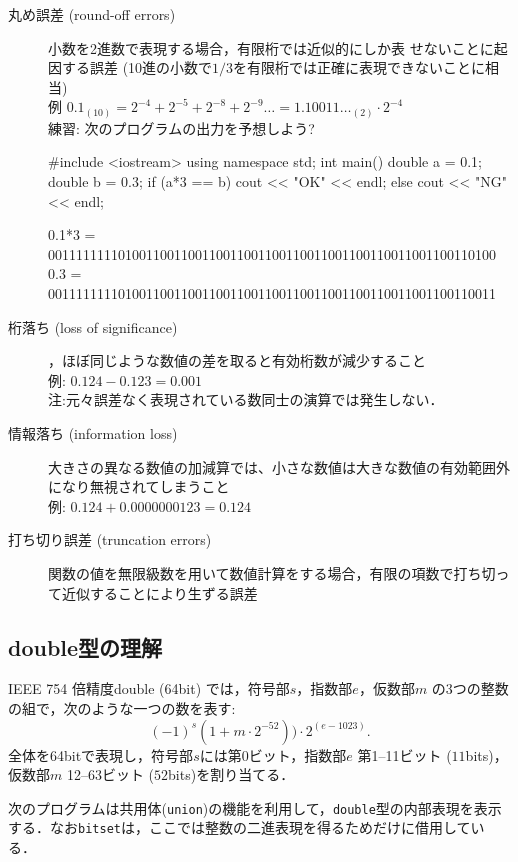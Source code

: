 \begin{description}
\item[丸め誤差 (round-off errors)] 小数を2進数で表現する場合，有限桁では近似的にしか表
  せないことに起因する誤差 (10進の小数で$1/3$を有限桁では正確に表現できないことに相当)\\
  例 $0.1_{(10)} = 2^{-4} + 2^{-5}+2^{-8}+2^{-9}\ldots =
  1.10011\ldots_{(2)}\cdot 2^{-4}$\\
  練習: 次のプログラムの出力を予想しよう?
  \begin{cbox}
#include <iostream>
using namespace std;
int main() {
  double a = 0.1;
  double b = 0.3;
  if (a*3 == b) cout << "OK" << endl;
  else cout << "NG" << endl;
}    
  \end{cbox}
  \begin{terminal}
0.1*3 = 0011111111010011001100110011001100110011001100110011001100110100
  0.3 = 0011111111010011001100110011001100110011001100110011001100110011    
  \end{terminal}
\item[桁落ち (loss of significance)] ，ほぼ同じような数値の差を取ると有効桁数が減少すること\\
  例: $0.124 - 0.123 = 0.001$\\
注:元々誤差なく表現されている数同士の演算では発生しない．
\item[情報落ち (information loss)] 大きさの異なる数値の加減算では、小さな数値は大きな数値の有効範囲外になり無視されてしまうこと\\
  例: $0.124 + 0.0000000123 = 0.124$
\item[打ち切り誤差 (truncation errors)] 関数の値を無限級数を用いて数値計算をする場合，有限の項数で打ち切って近似することにより生ずる誤差
\end{description}

\subsection{double型の理解}
IEEE 754 倍精度double (64bit) では，符号部$s$，指数部$e$，仮数部$m$ の3つの整数の組で，次のような一つの数を表す:
\begin{equation}
(-1)^s (1+m \cdot 2^{-52})) \cdot 2^{(e-1023)}.\label{eq:ieee64}
\end{equation}
全体を64bitで表現し，符号部$s$には第0ビット，指数部$e$ 第1--11ビット ($11$bits)，仮数部$m$ 12--63ビット ($52$bits)を割り当てる．

次のプログラムは共用体(\texttt{union})の機能を利用して，\texttt{double}型の内部表現を表示する．なお\texttt{bitset}は，ここでは整数の二進表現を得るためだけに借用している．

